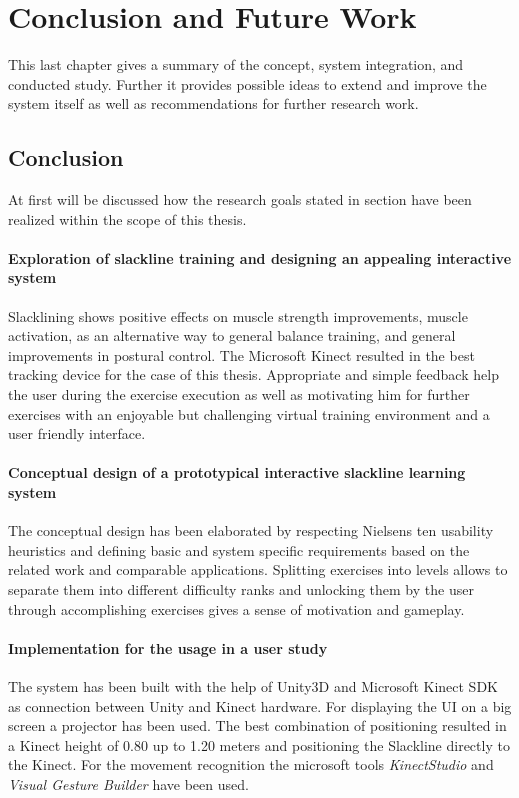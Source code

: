 \chapter{Conclusion and Future Work}\label{7_conclusion}
This last chapter gives a summary of the concept, system integration, and conducted study.
Further it provides possible ideas to extend and improve the system itself as well as recommendations for further research work.

\section{Conclusion}
At first will be discussed how the research goals stated in section \textit{} have been realized within the scope of this thesis.

\subsubsection{Exploration of slackline training and designing an appealing interactive system}
Slacklining shows positive effects on muscle strength improvements, muscle activation, as an alternative way to general balance training, and general improvements in postural control.
The Microsoft Kinect resulted in the best tracking device for the case of this thesis.
Appropriate and simple feedback help the user during the exercise execution as well as motivating him for further exercises with an enjoyable but challenging virtual training environment and a user friendly interface.


\subsubsection{Conceptual design of a prototypical interactive slackline learning system}
The conceptual design has been elaborated by respecting Nielsens ten usability heuristics and defining basic and system specific requirements based on the related work and comparable applications.
Splitting exercises into levels allows to separate them into different difficulty ranks and unlocking them by the user through accomplishing exercises gives a sense of motivation and gameplay.

\subsubsection{Implementation for the usage in a user study}
The system has been built with the help of Unity3D and Microsoft Kinect SDK as connection between Unity and Kinect hardware.
For displaying the UI on a  big screen a projector has been used.
The best combination of positioning resulted in a Kinect height of 0.80 up to 1.20 meters and positioning the Slackline directly to the Kinect.
For the movement recognition the microsoft tools \textit{KinectStudio} and \textit{Visual Gesture Builder} have been used.

